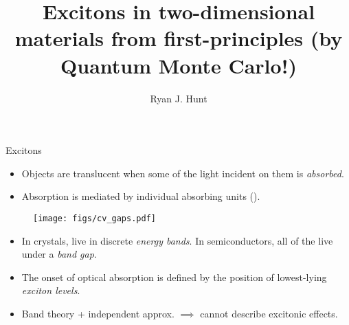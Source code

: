 \documentclass[10pt, pdf, hyperref={draft}, usenames, dvipsnames]{beamer}
\title{{\LARGE Excitons in two-dimensional materials from first-principles (by
Quantum Monte Carlo!)}}
\author{\large Ryan J. Hunt }%
\institute[]{\normalsize
Department of Physics \\
Lancaster University}
\date{}
\newcommand{\blue}[1]{{\bf\color{NavyBlue}{#1}}}
\begin{document}
\begin{frame}[plain]
  \titlepage
\end{frame}





\begin{frame}{Excitons}

\begin{itemize}

  \item Objects are translucent when some of the light incident on them is
  \textit{absorbed}.

  \item Absorption is mediated by individual absorbing units (\blue{$e^{-}$}).

\end{itemize}

\begin{minipage}[t]{0.3\textwidth}

\begin{figure}[H]
  \centering
  \texttt{[image: figs/cv\_gaps.pdf]}
\end{figure}

\end{minipage}%
\hfill
\begin{minipage}[t]{0.65\textwidth}

\begin{itemize}
\vspace{0.5cm}
  \item In crystals, \blue{$e^{-}$} live in discrete \textit{energy bands}.  In
  semiconductors, all of the \blue{$e^{-}$} live under a \textit{band
  gap}.\footnotemark
\vspace{0.5cm}
  \item The onset of optical absorption is defined by the position of
  lowest-lying \textit{exciton levels}.
\vspace{0.5cm}
  \item Band theory + independent \blue{$e^{-}$} approx. $\implies$ cannot describe
  excitonic effects.

\end{itemize}


\end{minipage}%

\end{frame}
\end{document}
